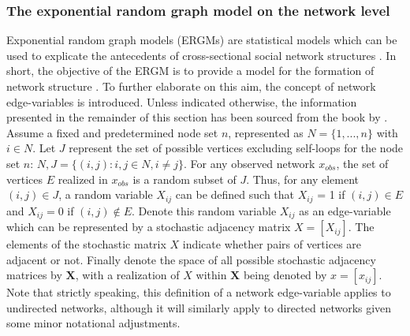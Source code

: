 \documentclass[a4paper, man, floatsintext]{apa6}
\begin{document}
\subsubsection{The exponential random graph model on the network level} Exponential random graph models (ERGMs) are statistical models which can be used to explicate the antecedents of cross-sectional social network structures \cite{lusher2013exponential}. In short, the objective of the ERGM is to provide a model for the formation of network structure \cite{lusher2013exponential}. To further elaborate on this aim, the concept of network edge-variables is introduced. Unless indicated otherwise, the information presented in the remainder of this section has been sourced from the book by . Assume a fixed and predetermined node set $n$, represented as $N = \{1, ..., n\}$ with $i \in N$. Let $J$ represent the set of possible vertices excluding self-loops for the node set $n$: $N, J = \{(i, j): i, j \in N, i \neq j\}$. For any observed network $x_{obs}$, the set of vertices $E$ realized in $x_{obs}$ is a random subset of $J$. Thus, for any element $(i, j) \in J$, a random variable $X_{ij}$ can be defined such that $X_{ij}$ = 1 if $(i, j) \in E$ and $X_{ij} = 0$ if $(i, j) \not\in E$. \clearpage \noindent Denote this random variable $X_{ij}$ as an edge-variable which can be represented by a stochastic adjacency matrix $X = [X_{ij}]$. The elements of the stochastic matrix $X$ indicate whether pairs of vertices are adjacent or not. Finally denote the space of all possible stochastic adjacency matrices by $\textbf{X}$, with a realization of $X$ within $\textbf{X}$ being denoted by $x = [x_{ij}]$. Note that strictly speaking, this definition of a network edge-variable applies to undirected networks, although it will similarly apply to directed networks given some minor notational adjustments.
\\
\end{document}
